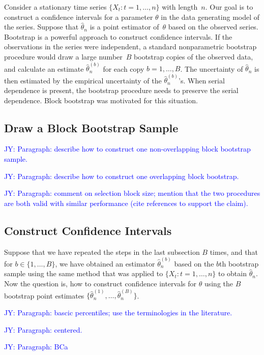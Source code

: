 \documentclass[12pt, letterpaper, titlepage]{article}
\newcommand{\jy}[1]{\textcolor{blue}{JY: #1}}
\begin{document}
Consider a stationary time series $\{X_t: t = 1, \ldots, n\}$ with length~$n$.
Our goal is to construct a confidence intervals for a parameter $\theta$ in the
data generating model of the series. Suppose that $\hat\theta_n$ is a point
estimator of~$\theta$ based on the observed series. Bootstrap is a powerful
approach to construct confidence intervals. If the observations in the series
were independent, a standard nonparametric bootstrap procedure would draw a
large number~$B$ bootstrap copies of the observed data, and calculate an
estimate $\hat\theta_n^{(b)}$ for each copy $b = 1, \ldots, B$. The uncertainty
of $\hat\theta_n$ is then estimated by the empirical uncertainty of the
$\hat\theta_n^{(b)}$'s. When serial dependence is present, the bootstrap
procedure needs to preserve the serial dependence. Block bootstrap was motivated
for this situation.

\subsection{Draw a Block Bootstrap Sample}

\jy{Paragraph: describe how to construct one non-overlapping block bootstrap
  sample.}

\jy{Paragraph: describe how to construct one overlapping block bootstrap.}

\jy{Paragraph: comment on selection block size;
  mention that the two procedures are both valid with similar performance (cite
  references to support the claim).}

\subsection{Construct Confidence Intervals}

Suppose that we have repeated the steps in the last subsection $B$ times, and
that for $b \in \{1, \ldots, B\}$, we have obtained an estimator
$\hat\theta_n^{(b)}$ based on the $b$th bootstrap sample using the same method
that was applied to $\{X_t: t = 1, \ldots, n\}$ to obtain $\hat\theta_n$.
Now the question is, how to construct confidence intervals for $\theta$
using the $B$ bootstrap point estimates
$\{\hat\theta_n^{(1)}, \ldots, \hat\theta_n^{(B)}\}$.


\jy{Paragraph: bascic percentiles; use the terminologies in the literature.}

\jy{Paragraph: centered.}

\jy{Paragraph: BCa}
\end{document}

